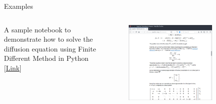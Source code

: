 \documentclass[11pt,t]{beamer}
\begin{document}
\begin{frame}[fragile]{Examples}  

	\begin{columns}[t]
		\begin{column}{.3\textwidth}
		A sample notebook to demonstrate how to solve the diffusion equation using Finite Different Method in Python [\href{http://nbviewer.jupyter.org/github/waltherg/notebooks/blob/master/2013-12-03-Crank_Nicolson.ipynb}{Link}]
	
 
		\end{column}
		\begin{column}{.7\textwidth}
			\vspace{-55pt}
			\begin{figure}
			\centering
			\includegraphics[width=0.80\textwidth]{jupyter_ex_fdm}
			
			\end{figure}
		\end{column}
	\end{columns}	
		
\end{frame}
\end{document}
